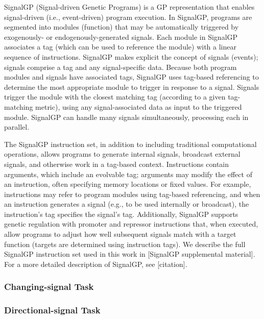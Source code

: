 SignalGP (Signal-driven Genetic Programs) is a GP representation that enables signal-driven (i.e., event-driven)
program execution.
In SignalGP, programs are segmented into modules (function) that may be automatically triggered by
exogenously- or endogenously-generated signals.
Each module in SignalGP associates a tag (which can be used to reference the module) with a linear
sequence of instructions.
SignalGP makes explicit the concept of signals (events); signals comprise a tag and any signal-specific
data.
Because both program modules and signals have associated tags, SignalGP uses tag-based referencing to
determine the most appropriate module to trigger in response to a signal.
Signals trigger the module with the closest matching tag (according to a given tag-matching metric),
using any signal-associated data as input to the triggered module.
SignalGP can handle many signals simultaneously, processing each in parallel.

The SignalGP instruction set, in addition to including traditional computational operations, allows
programs to generate internal signals, broadcast external signals, and otherwise work in a tag-based context.
Instructions contain arguments, which include an evolvable tag; arguments may modify the effect of an
instruction, often specifying memory locations or fixed values.
For example, instructions may refer to program modules using tag-based referencing, and when an instruction
generates a signal (e.g., to be used internally or broadcast), the instruction's tag specifies the signal's
tag.
Additionally, SignalGP supports genetic regulation with promoter and repressor instructions
that, when executed, allow programs to adjust how well subsequent signals match with a target function
(targets are determined using instruction tags).
We describe the full SignalGP instruction set used in this work in [SignalGP supplemental material].
For a more detailed description of SignalGP, see [citation].

\subsubsection{Changing-signal Task}


\subsubsection{Directional-signal Task}
